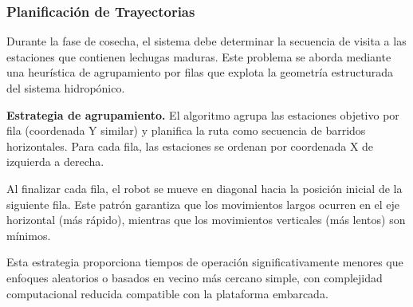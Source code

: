\subsubsection{Planificación de Trayectorias}

Durante la fase de cosecha, el sistema debe determinar la secuencia de visita a las estaciones que contienen lechugas maduras. Este problema se aborda mediante una heurística de agrupamiento por filas que explota la geometría estructurada del sistema hidropónico.

\textbf{Estrategia de agrupamiento.} El algoritmo agrupa las estaciones objetivo por fila (coordenada Y similar) y planifica la ruta como secuencia de barridos horizontales. Para cada fila, las estaciones se ordenan por coordenada X de izquierda a derecha.

Al finalizar cada fila, el robot se mueve en diagonal hacia la posición inicial de la siguiente fila. Este patrón garantiza que los movimientos largos ocurren en el eje horizontal (más rápido), mientras que los movimientos verticales (más lentos) son mínimos.

Esta estrategia proporciona tiempos de operación significativamente menores que enfoques aleatorios o basados en vecino más cercano simple, con complejidad computacional reducida compatible con la plataforma embarcada.
